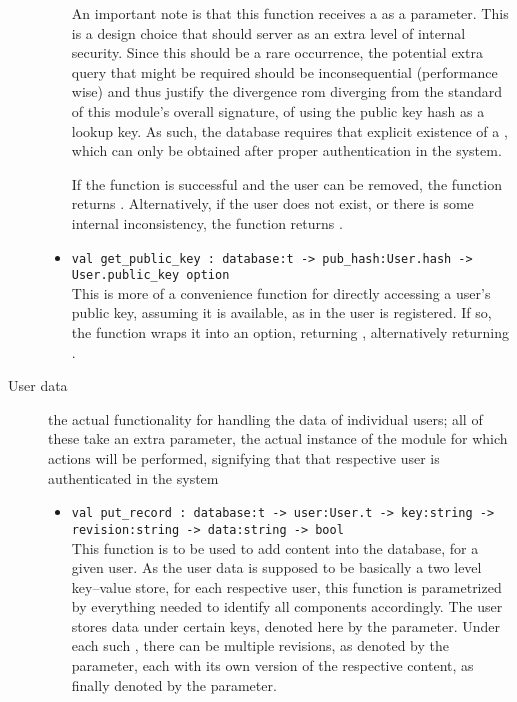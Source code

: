 \begin{description}
\begin{itemize}
  An important note is that this function receives a  as a parameter.
  This is a design choice that should server as an extra level of internal security.
  Since this should be a rare occurrence, the potential extra query that might be required should be inconsequential (performance wise) and thus justify the divergence rom diverging from the standard of this module's overall signature, of using the public key hash as a lookup key.
  As such, the database requires that explicit existence of a , which can only be obtained after proper authentication in the system.

  If the function is successful and the user can be removed, the function returns .
  Alternatively, if the user does not exist, or there is some internal inconsistency, the function returns .

  \item \verb|val get_public_key : database:t -> pub_hash:User.hash -> User.public_key option| \\
  This is more of a convenience function for directly accessing a user's public key, assuming it is available, as in the user is registered.
  If so, the function wraps it into an option, returning , alternatively returning .
  \end{itemize}
  \item[User data] the actual functionality for handling the data of individual users; all of these take an extra parameter, the actual instance of the  module for which actions will be performed, signifying that that respective user is authenticated in the system
  \begin{itemize}
  \item \verb|val put_record : database:t -> user:User.t -> key:string -> revision:string -> data:string -> bool| \\
  This function is to be used to add content into the database, for a given user.
  As the user data is supposed to be basically a two level key--value store, for each respective user, this function is parametrized by everything needed to identify all components accordingly.
  The user stores data under certain keys, denoted here by the  parameter.
  Under each such , there can be multiple revisions, as denoted by the   parameter, each with its own version of the respective content, as finally denoted by the  parameter.


\end{itemize}
\end{description}
